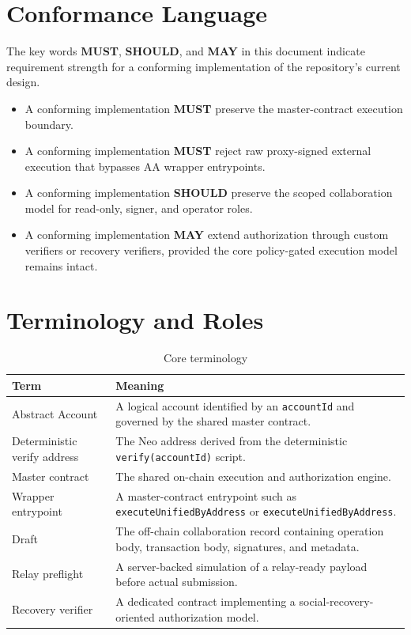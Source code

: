 \documentclass[11pt]{article}
\newcommand{\code}[1]{\texttt{#1}}
\newcommand{\must}{\textbf{MUST}}
\newcommand{\should}{\textbf{SHOULD}}
\newcommand{\mayword}{\textbf{MAY}}
\newcommand{\AAsystem}{AA}
\begin{document}
\section{Conformance Language}
The key words \must{}, \should{}, and \mayword{} in this document indicate requirement strength for a conforming implementation of the repository's current design.

\begin{itemize}
  \item A conforming implementation \must{} preserve the master-contract execution boundary.
  \item A conforming implementation \must{} reject raw proxy-signed external execution that bypasses \AAsystem{} wrapper entrypoints.
  \item A conforming implementation \should{} preserve the scoped collaboration model for read-only, signer, and operator roles.
  \item A conforming implementation \mayword{} extend authorization through custom verifiers or recovery verifiers, provided the core policy-gated execution model remains intact.
\end{itemize}

\section{Terminology and Roles}
\begin{table}[h!]
  \centering
  \caption{Core terminology}
  \begin{tabularx}{\textwidth}{>{\raggedright\arraybackslash}p{}X}
    \toprule
    Term & Meaning \\
    \midrule
    Abstract Account & A logical account identified by an \code{accountId} and governed by the shared master contract. \\
    Deterministic verify address & The Neo address derived from the deterministic \code{verify(accountId)} script. \\
    Master contract & The shared on-chain execution and authorization engine. \\
    Wrapper entrypoint & A master-contract entrypoint such as \code{executeUnifiedByAddress} or \code{executeUnifiedByAddress}. \\
    Draft & The off-chain collaboration record containing operation body, transaction body, signatures, and metadata. \\
    Relay preflight & A server-backed simulation of a relay-ready payload before actual submission. \\
    Recovery verifier & A dedicated contract implementing a social-recovery-oriented authorization model. \\
    \bottomrule
  \end{tabularx}
\end{table}
\end{document}
